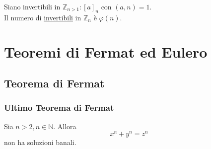 \documentclass[a4paper,12pt, oneside]{book}
\begin{document}
\begin{osservazione}
	Siano invertibili in $\mathbb{Z}_{n>1}: [a]_n$ con $(a,n)=1$.\\
	Il numero di \underline{invertibili} in $\mathbb{Z}_n$ è $\varphi(n)$.
\end{osservazione}



\chapter{Teoremi di Fermat ed Eulero}
\section{Teorema di Fermat}
\subsection{Ultimo Teorema di Fermat}
\begin{teorema}
	Sia $n > 2, n \in \mathbb{N}$. Allora $$x^n + y^n = z^n$$ non ha soluzioni banali.
\end{teorema}
\end{document}
